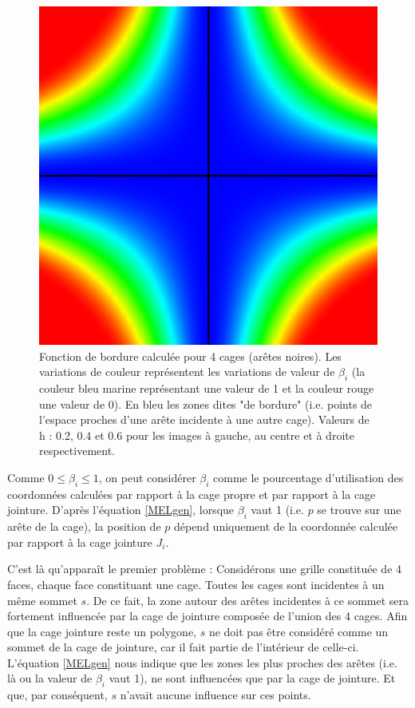 \begin{figure}[h]
\begin{center}
    \includegraphics[scale=0.35]{starCage-0-6}
    \caption{Fonction de bordure calculée pour 4 cages (arêtes
      noires). Les variations de couleur représentent les variations
      de valeur de $\beta_i$ (la couleur bleu marine représentant une
      valeur de 1 et la couleur rouge une valeur de 0). En bleu les
      zones dites "de bordure" (i.e. points de l'espace proches d'une
      arête incidente à une autre cage). Valeurs de h : 0.2, 0.4 et
      0.6 pour les images à gauche, au centre et à droite
      respectivement.}
    \label{MELpar}
  \end{center}
\end{figure}

Comme $0 \leq \beta_i \leq 1$, on peut considérer $\beta_i$ comme le
pourcentage d'utilisation des coordonnées calculées par rapport à la
cage propre et par rapport à la cage jointure. D'après l'équation
\ref{MELgen}, lorsque $\beta_i$ vaut 1 (i.e. $p$ se trouve sur une
arête de la cage), la position de $p$ dépend uniquement de la
coordonnée calculée par rapport à la cage jointure $J_i$.

C'est là qu'apparaît le premier problème : Considérons une grille
constituée de 4 faces, chaque face constituant une cage. Toutes les
cages sont incidentes à un même sommet $s$. De ce fait, la zone autour
des arêtes incidentes à ce sommet sera fortement influencée par la
cage de jointure composée de l'union des 4 cages. Afin que la cage
jointure reste un polygone, $s$ ne doit pas être considéré comme un
sommet de la cage de jointure, car il fait partie de l'intérieur de
celle-ci. L'équation \ref{MELgen} nous indique que les zones les plus
proches des arêtes (i.e. là ou la valeur de $\beta_i$ vaut 1), ne sont
influencées que par la cage de jointure. Et que, par conséquent, $s$
n'avait aucune influence sur ces points.

